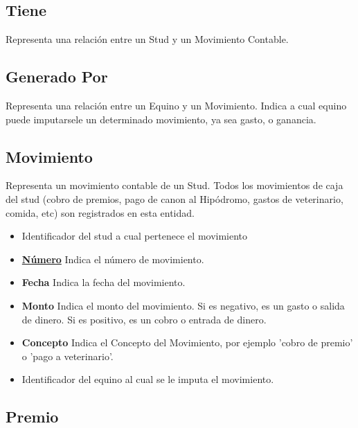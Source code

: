 \documentclass[a4paper,11pt]{article}
\begin{document}
\subsection{Tiene}

Representa una relación entre un Stud y un Movimiento Contable.

\subsection{Generado Por}

Representa una relación entre un Equino y un Movimiento. Indica a cual equino puede
imputarsele un determinado movimiento, ya sea gasto, o ganancia. 

\subsection{Movimiento}

Representa un movimiento contable de un Stud. Todos los movimientos de caja
del stud (cobro de premios, pago de canon al Hipódromo, gastos de veterinario, 
comida, etc) son registrados en esta entidad.

\begin{itemize}

  \item \textbf{\uline{}} Identificador del stud a cual pertenece el movimiento

  \item \textbf{\uline{Número}} Indica el número de movimiento.

  \item \textbf{Fecha} Indica la fecha del movimiento.

  \item \textbf{Monto} Indica el monto del movimiento. Si es negativo, es un 
  gasto o salida de dinero. Si es positivo, es un cobro o entrada de dinero.

  \item \textbf{Concepto} Indica el Concepto del Movimiento, por ejemplo 
  'cobro de premio' o 'pago a veterinario'.

  \item \textbf{} Identificador del equino al cual se le imputa el movimiento.
      
\end{itemize}

\subsection{Premio}
\end{document}
